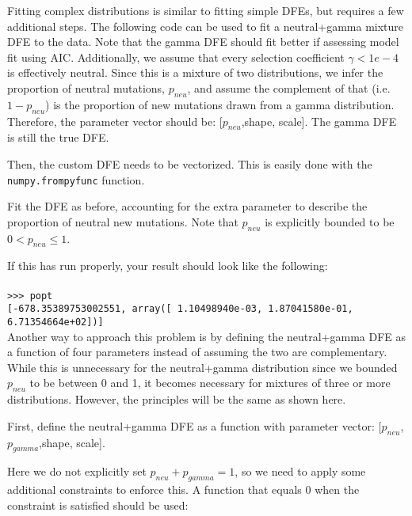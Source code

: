 \documentclass[11pt]{article}
\begin{document}
Fitting complex distributions is similar to fitting simple DFEs, but requires a few additional steps. The following code can be used to fit a neutral+gamma mixture DFE to the data. Note that the gamma DFE should fit better if assessing model fit using AIC. Additionally, we assume that every selection coefficient $\gamma < 1e-4$ is effectively neutral. Since this is a mixture of two distributions, we infer the proportion of neutral mutations, $p_{neu}$, and assume the complement of that (i.e. $1-p_{neu}$) is the proportion of new mutations drawn from a gamma distribution. Therefore, the parameter vector should be: [$p_{neu}$,shape, scale]. The gamma DFE is still the true DFE.



Then, the custom DFE needs to be vectorized. This is easily done with the \texttt{numpy.frompyfunc} function.



Fit the DFE as before, accounting for the extra parameter to describe the proportion of neutral new mutations. Note that $p_{neu}$ is explicitly bounded to be $0 < p_{neu} \leq 1$.



If this has run properly, your result should look like the following: \\ \\
\texttt{>>> popt} \\
\texttt{[-678.35389753002551, array([  1.10498940e-03,   1.87041580e-01,   6.71354664e+02])]} \\

Another way to approach this problem is by defining the neutral+gamma DFE as a function of four parameters instead of assuming the two are complementary. While this is unnecessary for the neutral+gamma distribution since we bounded $p_{neu}$ to be between 0 and 1, it becomes necessary for mixtures of three or more distributions. However, the principles will be the same as shown here. 

First, define the neutral+gamma DFE as a function with parameter vector: [$p_{neu}$,$p_{gamma}$,shape, scale]. 



Here we do not explicitly set $p_{neu} + p_{gamma} = 1$, so we need to apply some additional constraints to enforce this. A function that equals 0 when the constraint is satisfied should be used:
\end{document}
